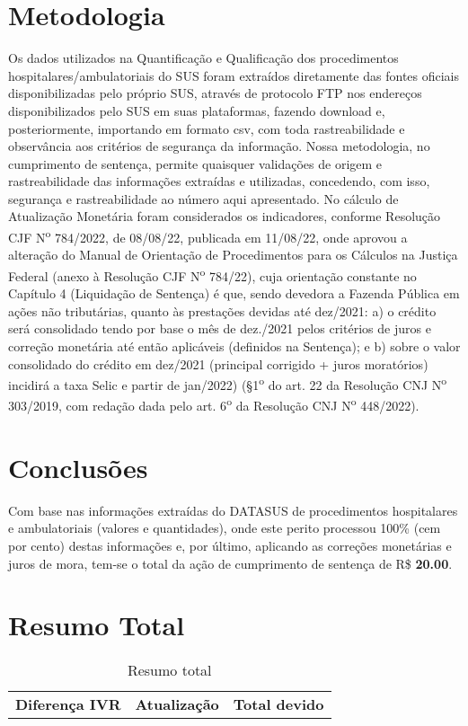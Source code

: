 \documentclass{report}
\begin{document}
\section{Metodologia}
Os dados utilizados na Quantificação e Qualificação dos procedimentos hospitalares/ambulatoriais do SUS foram extraídos diretamente das fontes oficiais disponibilizadas pelo próprio SUS, através de protocolo FTP nos endereços disponibilizados pelo SUS em suas plataformas, fazendo download e, posteriormente, importando em formato csv, com toda rastreabilidade e observância aos critérios de segurança da informação.
Nossa metodologia, no cumprimento de sentença, permite quaisquer validações de origem e rastreabilidade das informações extraídas e utilizadas, concedendo, com isso, segurança e rastreabilidade ao número aqui apresentado.
No cálculo de Atualização Monetária foram considerados os indicadores, conforme Resolução CJF N\textsuperscript{o} 784/2022, de 08/08/22, publicada em 11/08/22, onde aprovou a alteração do Manual de Orientação de Procedimentos para os Cálculos na Justiça Federal (anexo à Resolução CJF N\textsuperscript{o} 784/22), cuja orientação constante no Capítulo 4 (Liquidação de Sentença) é que, sendo devedora a Fazenda Pública em ações não tributárias, quanto às prestações devidas até dez/2021: a) o crédito será consolidado tendo por base o mês de dez./2021 pelos critérios de juros e correção monetária até então aplicáveis (definidos na Sentença); e b) sobre o valor consolidado do crédito em dez/2021 (principal corrigido + juros moratórios) incidirá a taxa Selic e partir de jan/2022) (\S 1\textsuperscript{o} do art. 22 da Resolução CNJ N\textsuperscript{o} 303/2019, com redação dada pelo art. 6\textsuperscript{o} da Resolução CNJ  N\textsuperscript{o} 448/2022).

\section{Conclusões}
Com base nas informações extraídas do DATASUS de procedimentos hospitalares e ambulatoriais (valores e quantidades), onde este perito processou 100\% (cem por cento) destas informações e, por último, aplicando as correções monetárias e juros de mora, tem-se o total da ação de cumprimento de sentença de  R\$ \textbf{20.00}.

\section{Resumo Total}
\begin{longtable}[c]{|c|c|c|}
\caption{Resumo total} \\ \hline
\textbf{Diferença IVR} &
\textbf{Atualização} &
\textbf{Total devido}
\endhead \hline

\end{longtable}
\end{document}
